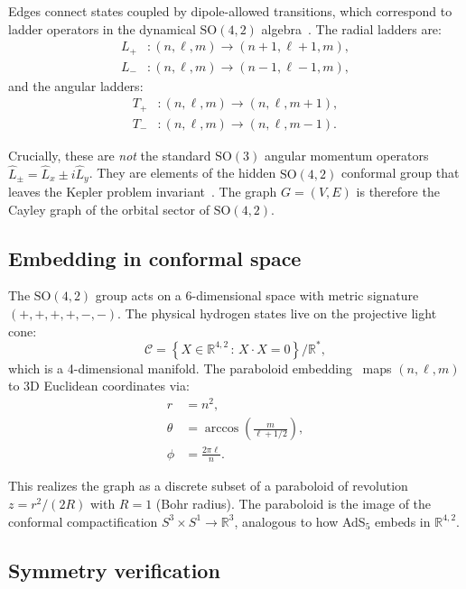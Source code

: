 \documentclass[aps,prd,twocolumn,superscriptaddress,groupedaddress,showpacs]{revtex4-2}
\newcommand{\SO}{\ensuremath{\text{SO}}}
\begin{document}
Edges connect states coupled by dipole-allowed transitions, which correspond to ladder operators in the dynamical $\SO(4,2)$ algebra~\cite{Barut1967}. The radial ladders are:
\begin{align}
L_+ &: (n, \ell, m) \to (n+1, \ell+1, m), \\
L_- &: (n, \ell, m) \to (n-1, \ell-1, m),
\end{align}
and the angular ladders:
\begin{align}
T_+ &: (n, \ell, m) \to (n, \ell, m+1), \\
T_- &: (n, \ell, m) \to (n, \ell, m-1).
\end{align}

Crucially, these are \emph{not} the standard $\SO(3)$ angular momentum operators $\hat{L}_\pm = \hat{L}_x \pm i \hat{L}_y$. They are elements of the hidden $\SO(4,2)$ conformal group that leaves the Kepler problem invariant~\cite{Fock1935}. The graph $G = (V, E)$ is therefore the Cayley graph of the orbital sector of $\SO(4,2)$.

\subsection{Embedding in conformal space}

The $\SO(4,2)$ group acts on a 6-dimensional space with metric signature $(+, +, +, +, -, -)$. The physical hydrogen states live on the projective light cone:
\begin{equation}
\mathcal{C} = \left\{ X \in \mathbb{R}^{4,2} \,:\, X \cdot X = 0 \right\} / \mathbb{R}^*,
\end{equation}
which is a 4-dimensional manifold. The paraboloid embedding~\cite{Louthan_I} maps $(n, \ell, m)$ to 3D Euclidean coordinates via:
\begin{align}
r &= n^2, \\
\theta &= \arccos\left(\frac{m}{\ell + 1/2}\right), \\
\phi &= \frac{2\pi \ell}{n}.
\end{align}

This realizes the graph as a discrete subset of a paraboloid of revolution $z = r^2/(2R)$ with $R = 1$ (Bohr radius). The paraboloid is the image of the conformal compactification $S^3 \times S^1 \to \mathbb{R}^3$, analogous to how AdS$_5$ embeds in $\mathbb{R}^{4,2}$.

\subsection{Symmetry verification}
\end{document}
